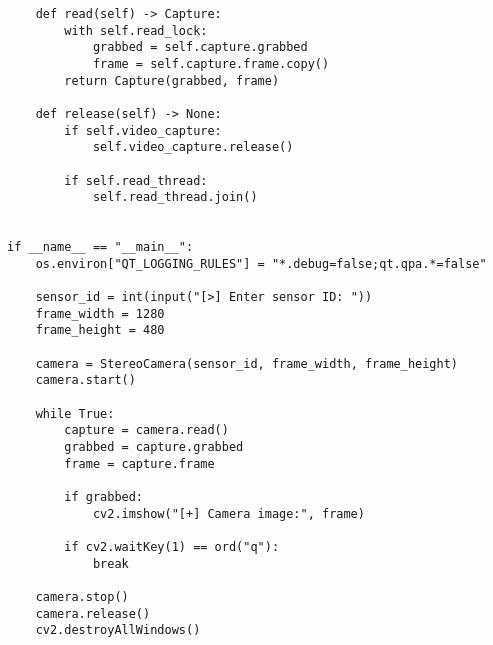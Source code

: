 \begin{verbatim}
    def read(self) -> Capture:
        with self.read_lock:
            grabbed = self.capture.grabbed
            frame = self.capture.frame.copy()
        return Capture(grabbed, frame)

    def release(self) -> None:
        if self.video_capture:
            self.video_capture.release()

        if self.read_thread:
            self.read_thread.join()


if __name__ == "__main__":
    os.environ["QT_LOGGING_RULES"] = "*.debug=false;qt.qpa.*=false"

    sensor_id = int(input("[>] Enter sensor ID: "))
    frame_width = 1280
    frame_height = 480

    camera = StereoCamera(sensor_id, frame_width, frame_height)
    camera.start()

    while True:
        capture = camera.read()
        grabbed = capture.grabbed
        frame = capture.frame

        if grabbed:
            cv2.imshow("[+] Camera image:", frame)

        if cv2.waitKey(1) == ord("q"):
            break

    camera.stop()
    camera.release()
    cv2.destroyAllWindows()
\end{verbatim}

